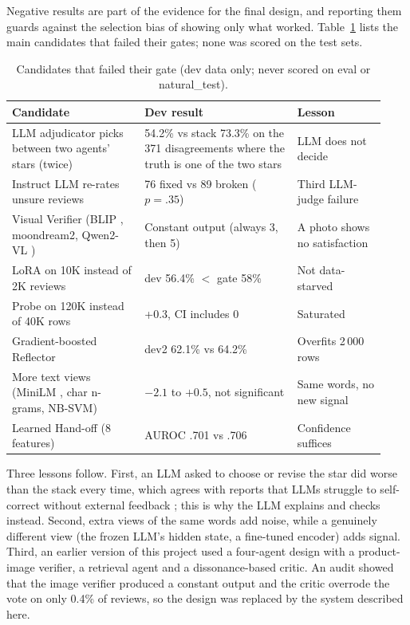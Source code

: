 \documentclass[runningheads]{llncs}
\begin{document}
Negative results are part of the evidence for the final design, and reporting them guards against the selection bias of showing only what worked. Table~\ref{tbl:failed} lists the main candidates that failed their gates; none was scored on the test sets.

\begin{table}[t]
\centering
\caption{Candidates that failed their gate (dev data only; never scored on eval or natural\_test).}
\label{tbl:failed}
\small
\begin{tabular}{p{0.33\linewidth}p{0.38\linewidth}p{0.22\linewidth}}
\toprule
Candidate & Dev result & Lesson \\
\midrule
LLM adjudicator picks between two agents' stars (twice) & 54.2\% vs stack 73.3\% on the 371 disagreements where the truth is one of the two stars & LLM does not decide \\
Instruct LLM re-rates unsure reviews & 76 fixed vs 89 broken ($p=.35$) & Third LLM-judge failure \\
Visual Verifier (BLIP \cite{li2022blip}, moondream2, Qwen2-VL \cite{wang2024qwen2vl}) & Constant output (always 3, then 5) & A photo shows no satisfaction \\
LoRA on 10K instead of 2K reviews & dev 56.4\% $<$ gate 58\% & Not data-starved \\
Probe on 120K instead of 40K rows & +0.3, CI includes 0 & Saturated \\
Gradient-boosted Reflector & dev2 62.1\% vs 64.2\% & Overfits 2\,000 rows \\
More text views (MiniLM \cite{wang2020minilm}, char n-grams, NB-SVM) & $-2.1$ to $+0.5$, not significant & Same words, no new signal \\
Learned Hand-off (8 features) & AUROC .701 vs .706 & Confidence suffices \\
\bottomrule
\end{tabular}
\end{table}

Three lessons follow. First, an LLM asked to choose or revise the star did worse than the stack every time, which agrees with reports that LLMs struggle to self-correct without external feedback \cite{huang2024cannot}; this is why the LLM explains and checks instead. Second, extra views of the same words add noise, while a genuinely different view (the frozen LLM's hidden state, a fine-tuned encoder) adds signal. Third, an earlier version of this project used a four-agent design with a product-image verifier, a retrieval agent and a dissonance-based critic. An audit showed that the image verifier produced a constant output and the critic overrode the vote on only 0.4\% of reviews, so the design was replaced by the system described here.
\end{document}
